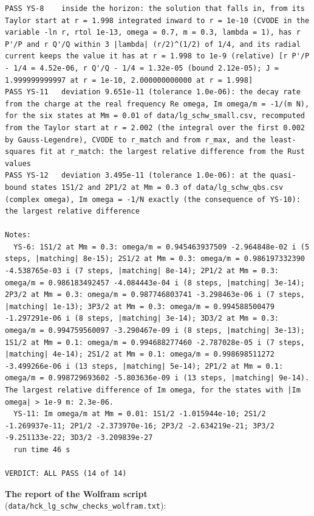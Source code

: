 \documentclass[
  10pt,
]{article}
\begin{document}
\begin{verbatim}
PASS YS-8    inside the horizon: the solution that falls in, from its Taylor start at r = 1.998 integrated inward to r = 1e-10 (CVODE in the variable -ln r, rtol 1e-13, omega = 0.7, m = 0.3, lambda = 1), has r P'/P and r Q'/Q within 3 |lambda| (r/2)^(1/2) of 1/4, and its radial current keeps the value it has at r = 1.998 to 1e-9 (relative) [r P'/P - 1/4 = 4.52e-06, r Q'/Q - 1/4 = 1.32e-05 (bound 2.12e-05); J = 1.999999999997 at r = 1e-10, 2.000000000000 at r = 1.998]
PASS YS-11   deviation 9.651e-11 (tolerance 1.0e-06): the decay rate from the charge at the real frequency Re omega, Im omega/m = -1/(m N), for the six states at Mm = 0.01 of data/lg_schw_small.csv, recomputed from the Taylor start at r = 2.002 (the integral over the first 0.002 by Gauss-Legendre), CVODE to r_match and from r_max, and the least-squares fit at r_match: the largest relative difference from the Rust values
PASS YS-12   deviation 3.495e-11 (tolerance 1.0e-06): at the quasi-bound states 1S1/2 and 2P1/2 at Mm = 0.3 of data/lg_schw_qbs.csv (complex omega), Im omega = -1/N exactly (the consequence of YS-10): the largest relative difference

Notes:
  YS-6: 1S1/2 at Mm = 0.3: omega/m = 0.945463937509 -2.964848e-02 i (5 steps, |matching| 8e-15); 2S1/2 at Mm = 0.3: omega/m = 0.986197332390 -4.538765e-03 i (7 steps, |matching| 8e-14); 2P1/2 at Mm = 0.3: omega/m = 0.986183492457 -4.084443e-04 i (8 steps, |matching| 3e-14); 2P3/2 at Mm = 0.3: omega/m = 0.987746803741 -3.298463e-06 i (7 steps, |matching| 1e-13); 3P3/2 at Mm = 0.3: omega/m = 0.994588500479 -1.297291e-06 i (8 steps, |matching| 3e-14); 3D3/2 at Mm = 0.3: omega/m = 0.994759560097 -3.290467e-09 i (8 steps, |matching| 3e-13); 1S1/2 at Mm = 0.1: omega/m = 0.994688277460 -2.787028e-05 i (7 steps, |matching| 4e-14); 2S1/2 at Mm = 0.1: omega/m = 0.998698511272 -3.499266e-06 i (13 steps, |matching| 5e-14); 2P1/2 at Mm = 0.1: omega/m = 0.998729693602 -5.803636e-09 i (13 steps, |matching| 9e-14).  The largest relative difference of Im omega, for the states with |Im omega| > 1e-9 m: 2.3e-06.
  YS-11: Im omega/m at Mm = 0.01: 1S1/2 -1.015944e-10; 2S1/2 -1.269937e-11; 2P1/2 -2.373970e-16; 2P3/2 -2.634219e-21; 3P3/2 -9.251133e-22; 3D3/2 -3.209839e-27
  run time 46 s

VERDICT: ALL PASS (14 of 14)
\end{verbatim}

\textbf{The report of the Wolfram script}
(\texttt{data/hck\_lg\_schw\_checks\_wolfram.txt}):
\end{document}
